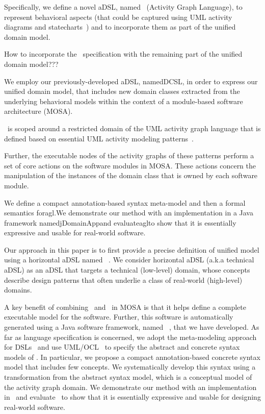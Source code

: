 Specifically, we define a novel aDSL, named \agl~(Activity Graph Language), to represent behavioral aspects (that could be captured using UML activity diagrams and statecharts~\cite{omg_unified_2015}) and to incorporate them as part of the unified domain model.

How to incorporate the \agl~specification with the remaining part of the unified domain model???

We employ our previously-developed aDSL, namedDCSL, in order to express our unified domain model, that includes new domain classes extracted from the underlying behavioral models within the context of a module-based software architecture (MOSA). 


\agl~is scoped around a restricted domain of the UML activity graph language that is defined based on essential UML activity modeling patterns~\cite{omg_unified_2015}. 


Further, the executable nodes of the activity graphs of these patterns perform a set of core actions on the software modules in MOSA. These actions concern the manipulation of the instances of the domain class that is owned by each software module.


We define a compact annotation-based syntax meta-model and then a formal semantics foragl.We demonstrate our method with an implementation in a Java framework namedjDomainAppand evaluateaglto show that it is essentially expressive and usable for real-world software.

Our approach in this paper is to first provide a precise definition of unified model using a horizontal aDSL named \dcsl~\cite{le_domain_2018}. We consider horizontal aDSL (a.k.a technical aDSL) as an aDSL that targets a technical (low-level) domain, whose concepts describe design patterns that often underlie a class of real-world (high-level) domains. 
%


A key benefit of combining \dcsl~and \agl~in MOSA is that it helps define a complete executable model for the software. Further, this software is automatically generated using a Java software framework, named \jdomainapp~\cite{le_jdomainapp_2017}, that we have developed.
%
As far as language specification is concerned, we adopt the meta-modeling approach for DSLs~\cite{kleppe_software_2008} and use UML/OCL~\cite{omg_unified_2015, omg_object_2014} to specify the abstract and concrete syntax models of \agl. In particular, we propose a compact annotation-based concrete syntax model that includes few concepts. We systematically develop this syntax using a transformation from the abstract syntax model, which is a conceptual model of the activity graph domain.
%
We demonstrate our method with an implementation in \jdomainapp~and evaluate \agl~to show that it is essentially expressive and usable for designing real-world software. 

